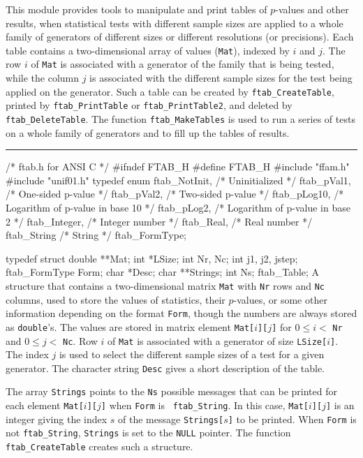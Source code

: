 
This module provides tools to manipulate and print tables of $p$-values
and other results, when statistical tests with different sample sizes are
applied to a whole family of generators of different sizes or different
resolutions (or precisions). Each table contains a two-dimensional array of
values ({\tt Mat}), indexed by $i$ and $j$. The row $i$ of {\tt Mat} is
associated with a generator of the family that is being tested, while the
column $j$ is associated with the different sample sizes for the test
being applied on the generator. Such a table can be created by 
{\tt ftab\_CreateTable}, printed by {\tt ftab\_PrintTable} or
{\tt ftab\_PrintTable2}, and deleted by {\tt ftab\_DeleteTable}.
The function {\tt ftab\_MakeTables} is used to run a series of tests on a
whole family of generators and to fill up the tables of results.

\bigskip
\hrule
\code\hide
/* ftab.h for ANSI C */
#ifndef FTAB_H
#define FTAB_H
\endhide
#include "ffam.h"
#include "unif01.h"
\endcode
\code
\hide
typedef enum {
   ftab_NotInit,              /* Uninitialized */
   ftab_pVal1,                /* One-sided p-value */
   ftab_pVal2,                /* Two-sided p-value */
   ftab_pLog10,               /* Logarithm of p-value in base 10 */
   ftab_pLog2,                /* Logarithm of p-value in base 2 */
   ftab_Integer,              /* Integer number */
   ftab_Real,                 /* Real number */
   ftab_String                /* String */
} ftab_FormType;
\endhide

typedef struct {
   double **Mat;
   int *LSize;
   int Nr, Nc;
   int j1, j2, jstep;
   ftab_FormType Form;
   char *Desc;
   char **Strings;
   int Ns;
} ftab_Table;
\endcode
 \tab
  A structure that contains a two-dimensional matrix {\tt Mat} with {\tt Nr}
  rows and {\tt Nc} columns, used to store the values of statistics, their
  $p$-values, or some other information depending on the format {\tt Form},
  though the numbers are always stored as {\tt double}'s.
  The values are stored in matrix element {\tt Mat[$i$][$j$]} for
  $0 \le i <$ {\tt Nr} and $0 \le j <$ {\tt Nc}. Row $i$ of {\tt Mat}
  is associated with a generator of size {\tt LSize[$i$]}. The index $j$ is
  used to select the different sample sizes of a test for a given
  generator. The character string {\tt Desc} gives a short description of
  the table.

  The array {\tt Strings} points to the {\tt Ns} possible messages that can
  be printed for each element {\tt Mat[$i$][$j$]} when {\tt Form} is {\tt
  ftab\_String}. In this case, {\tt Mat[$i$][$j$]} is an integer giving the
  index $s$ of the message {\tt Strings[$s$]} to be printed. When {\tt Form}
  is not {\tt ftab\_String}, {\tt Strings} is set to the {\tt NULL}
  pointer.
  The function {\tt ftab\_CreateTable} creates such a structure.
 \endtab




